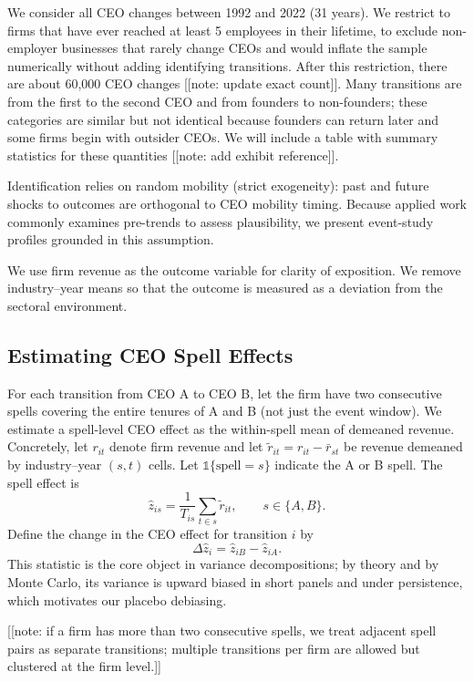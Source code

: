 \documentclass[11pt,a4paper]{article}
\begin{document}
We consider all CEO changes between 1992 and 2022 (31 years). We restrict to firms that have ever reached at least 5 employees in their lifetime, to exclude non-employer businesses that rarely change CEOs and would inflate the sample numerically without adding identifying transitions. After this restriction, there are about 60,000 CEO changes [[note: update exact count]]. Many transitions are from the first to the second CEO and from founders to non-founders; these categories are similar but not identical because founders can return later and some firms begin with outsider CEOs. We will include a table with summary statistics for these quantities [[note: add exhibit reference]].

Identification relies on random mobility (strict exogeneity): past and future shocks to outcomes are orthogonal to CEO mobility timing. Because applied work commonly examines pre-trends to assess plausibility, we present event-study profiles grounded in this assumption.

We use firm revenue as the outcome variable for clarity of exposition. We remove industry–year means so that the outcome is measured as a deviation from the sectoral environment.

\subsection*{Estimating CEO Spell Effects}
For each transition from CEO A to CEO B, let the firm have two consecutive spells covering the entire tenures of A and B (not just the event window). We estimate a spell-level CEO effect as the within-spell mean of demeaned revenue. Concretely, let \(r_{it}\) denote firm revenue and let \(\tilde r_{it}=r_{it}-\bar r_{st}\) be revenue demeaned by industry–year \((s,t)\) cells. Let \(\mathbb 1\{\text{spell}=s\}\) indicate the A or B spell. The spell effect is
\begin{equation}
\hat z_{is} = \frac{1}{T_{is}}\sum_{t\in s} \tilde r_{it},\qquad s\in\{A,B\}.
\end{equation}
Define the change in the CEO effect for transition \(i\) by
\begin{equation}
\Delta \hat z_i = \hat z_{iB} - \hat z_{iA}.
\end{equation}
This statistic is the core object in variance decompositions; by theory and by Monte Carlo, its variance is upward biased in short panels and under persistence, which motivates our placebo debiasing.

[[note: if a firm has more than two consecutive spells, we treat adjacent spell pairs as separate transitions; multiple transitions per firm are allowed but clustered at the firm level.]]
\end{document}
